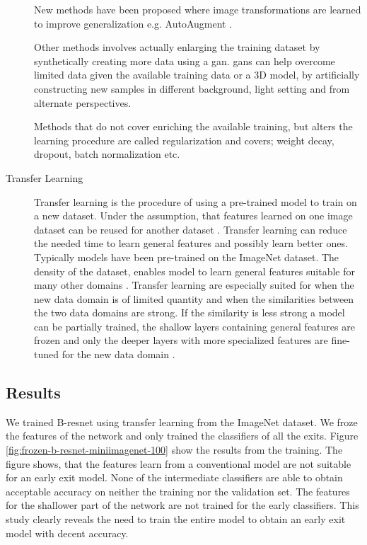 \begin{description}
	New methods have been proposed where image transformations are learned to improve generalization e.g. AutoAugment \cite{cubuk_autoaugment:_2018}. 
	
	Other methods involves actually enlarging the training dataset by synthetically creating more data using a \gls{gan}. \gls{gan}s can help overcome limited data given the available training data or a 3D model, by artificially constructing new samples in different background, light setting and from alternate perspectives.
	
	Methods that do not cover enriching the available training, but alters the learning procedure are called regularization and covers; weight decay, dropout, batch normalization etc.
	
	\item[Transfer Learning] Transfer learning is the procedure of using a pre-trained model to train on a new dataset. Under the assumption, that features learned on one image dataset can be reused for another dataset \cite{yosinski_how_2014}. Transfer learning can reduce the needed time to learn general features and possibly learn better ones. Typically models have been pre-trained on the ImageNet dataset. The density of the dataset, enables model to learn general features suitable for many other domains \cite{kornblith_better_2019}. Transfer learning are especially suited for when the new data domain is of limited quantity and when the similarities between the two data domains are strong. If the similarity is less strong a model can be partially trained, the shallow layers containing general features are frozen and only the deeper layers with more specialized features are fine-tuned for the new data domain \cite{li_cs231n:_2018}.
\end{description}

\subsection{Results} \label{sec:training-results}

We trained B-\gls{resnet} using transfer learning from the ImageNet dataset. We froze the features of the network and only trained the classifiers of all the exits. Figure \ref{fig:frozen-b-resnet-miniimagenet-100} show the results from the training. The figure shows, that the features learn from a conventional model are not suitable for an early exit model. None of the intermediate classifiers are able to obtain acceptable accuracy on neither the training nor the validation set. The features for the shallower part of the network are not trained for the early classifiers. This study clearly reveals the need to train the entire model to obtain an early exit model with decent accuracy.  

